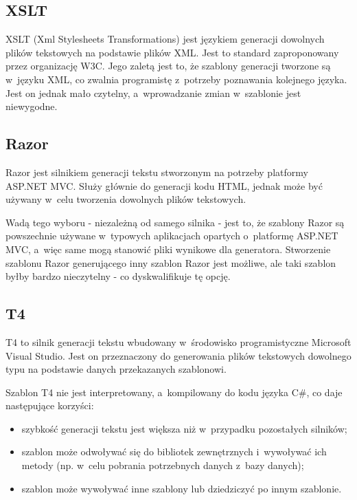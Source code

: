 \subsection{XSLT}

XSLT (Xml Stylesheets Transformations) jest językiem generacji dowolnych plików tekstowych na podstawie plików XML.
Jest to standard zaproponowany przez organizację W3C.
Jego zaletą jest to, że szablony generacji tworzone są w~języku XML, co zwalnia programistę z~potrzeby poznawania kolejnego języka.
Jest on jednak mało czytelny, a~wprowadzanie zmian w~szablonie jest niewygodne.


\subsection{Razor}

Razor jest silnikiem generacji tekstu stworzonym na potrzeby platformy ASP.NET MVC.
Służy głównie do generacji kodu HTML, jednak może być używany w~celu tworzenia dowolnych plików tekstowych.

Wadą tego wyboru - niezależną od samego silnika - jest to, że szablony Razor są powszechnie używane w~typowych aplikacjach opartych o~platformę ASP.NET MVC, a~więc same mogą stanowić pliki wynikowe dla generatora.
Stworzenie szablonu Razor generującego inny szablon Razor jest możliwe, ale taki szablon byłby bardzo nieczytelny - co dyskwalifikuje tę opcję.


\subsection{T4}

T4 to silnik generacji tekstu wbudowany w~środowisko programistyczne Microsoft Visual Studio.
Jest on przeznaczony do generowania plików tekstowych dowolnego typu na podstawie danych przekazanych szablonowi.

Szablon T4 nie jest interpretowany, a~kompilowany do kodu języka C\#, co daje następujące korzyści:

\begin{itemize}
 \item szybkość generacji tekstu jest większa niż w~przypadku pozostałych silników;
 \item szablon może odwoływać się do bibliotek zewnętrznych i~wywoływać ich metody (np. w~celu pobrania potrzebnych danych z~bazy danych);
 \item szablon może wywoływać inne szablony lub dziedziczyć po innym szablonie.
\end{itemize}

